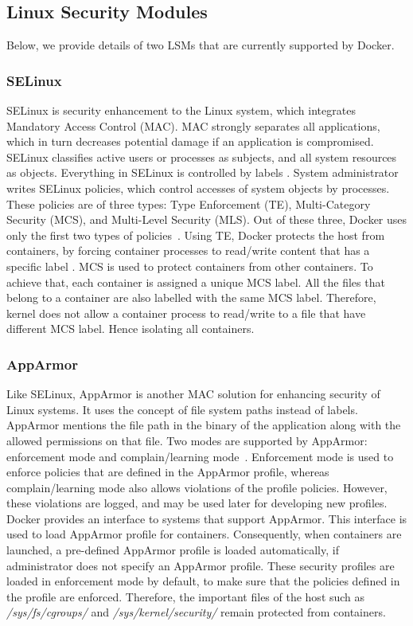 \subsection{Linux Security Modules}

Below, we provide details of two LSMs that are currently
supported by Docker.

\subsubsection{SELinux}

SELinux is security enhancement to the Linux system, which
integrates Mandatory Access Control (MAC). MAC strongly separates
all applications, which in turn decreases potential damage if an
application is compromised. SELinux classifies active users or
processes as subjects, and all system resources as objects.
Everything in SELinux is controlled by labels
\cite{smalley2001implementing}. System administrator writes
SELinux policies, which control accesses of system objects
by processes. These policies are of three types: Type
Enforcement (TE), Multi-Category Security (MCS), and Multi-Level
Security (MLS). Out of these three, Docker
uses only the first two types of policies~\cite{bui2015analysis}. Using TE,
Docker protects the host from containers,
by forcing container processes to read/write content
that has a specific label \cite{bui2015analysis}.
MCS is used to protect containers from
other containers. To achieve that, each container is
assigned a unique MCS label. All the files that belong to a
container are also labelled with the same MCS label.
Therefore, kernel does not allow a container process to read/write to a file
that have different MCS label. Hence isolating all containers.

\subsubsection{AppArmor}

Like SELinux, AppArmor is another MAC solution
for enhancing security of Linux systems. It uses
the concept of file system paths instead of labels.
AppArmor mentions the file path in the binary of
the application along with the allowed permissions
on that file. Two modes are supported by AppArmor:
enforcement mode and complain/learning mode~\cite{bui2015analysis}.
Enforcement mode is used to enforce policies that are
defined in the AppArmor profile, whereas complain/learning
mode also allows violations of the profile policies.
However, these violations are logged, and may be used later for
developing new profiles. Docker provides an interface to systems
that support AppArmor. This interface is used to load
AppArmor profile for containers. Consequently, when
containers are launched, a pre-defined AppArmor profile is
loaded automatically, if administrator does not specify
an AppArmor profile. These security profiles are loaded in
enforcement mode by default, to make sure that the policies
defined in the profile are enforced. Therefore, the
important files of the host such as \textit{/sys/fs/cgroups/}
and \textit{/sys/kernel/security/} remain protected from
containers.


